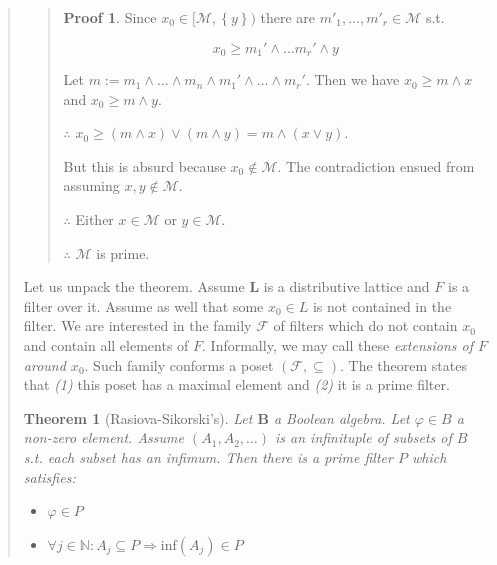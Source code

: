 \documentclass[a4paper, 12pt]{article}
\newtheorem{theorem}{Theorem}
\theoremstyle{definition}
\theoremstyle{definition}
\theoremstyle{definition}
\newtheorem{pro}{Proof}
\begin{document}
\begin{quote}
\begin{quote}
\begin{pro}
    Since $x_0 \in [\mathcal{M}, \left\{ y \right\}) $ there are 
    $m'_1, \ldots, m'_r \in \mathcal{M}$ s.t. 

    \begin{equation*}
        x_0 \geq m_1' \land  \ldots m_r' \land  y
    \end{equation*}

    Let $m := m_1 \land  \ldots \land  m_n \land  m_1' \land  \ldots \land  m_r'$.
    Then we have $x_0 \geq m \land  x$ and $x_0 \geq m \land  y$.

    $\therefore $ $x_0 \geq (m \land  x) \lor  (m \land  y) = m\land (x \lor  y)$.

    But this is absurd because $x_0 \not\in \mathcal{M}$. The contradiction 
    ensued from assuming $x, y \not\in \mathcal{M}$.

    $\therefore $ Either $x \in \mathcal{M}$ or $y \in \mathcal{M}$.

    $\therefore $ $\mathcal{M}$ is prime.
    


\end{pro}

\end{quote}
\normalsize

Let us unpack the theorem. Assume $\textbf{L}$ is a distributive lattice 
and $F$ is a filter over it. Assume as well that some $x_0 \in L$ is not 
contained in the filter. We are interested in the family $\mathcal{F}$ of filters which do not contain
$x_0$ and contain all elements of $F$. Informally, we may call these
\textit{extensions of $F$ around $x_0$}. Such family conforms a poset
$(\mathcal{F}, \subseteq )$. The theorem states that \textit{(1)} this poset
has a maximal element and \textit{(2)} it is a prime filter.

\begin{theorem}[Rasiova-Sikorski's]
    Let $\textbf{B}$ a Boolean algebra. Let $\varphi \in B$ a non-zero element. Assume $(A_1, A_2, \ldots )$
    is an infinituple of subsets of $B$ s.t. each subset has an infimum. Then there is a 
    prime filter $P$ which satisfies: 

    \begin{itemize}
        \item $\varphi \in P$
        \item $\forall j \in \mathbb{N} : A_j \subseteq P \Rightarrow \text{inf}(A_j) \in P$
    \end{itemize}
\end{theorem}



\end{quote}
\end{document}
